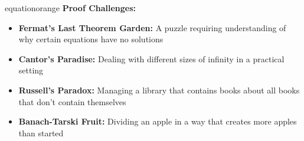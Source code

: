 \documentclass[11pt]{article}
\begin{document}
\begin{campaignsection}{equationorange}
\textbf{Proof Challenges:}
\begin{itemize}
    \item \textbf{Fermat's Last Theorem Garden:} A puzzle requiring understanding of why certain equations have no solutions
    \item \textbf{Cantor's Paradise:} Dealing with different sizes of infinity in a practical setting
    \item \textbf{Russell's Paradox:} Managing a library that contains books about all books that don't contain themselves
    \item \textbf{Banach-Tarski Fruit:} Dividing an apple in a way that creates more apples than started
\end{itemize}
\end{campaignsection}

\newpage
\end{document}

